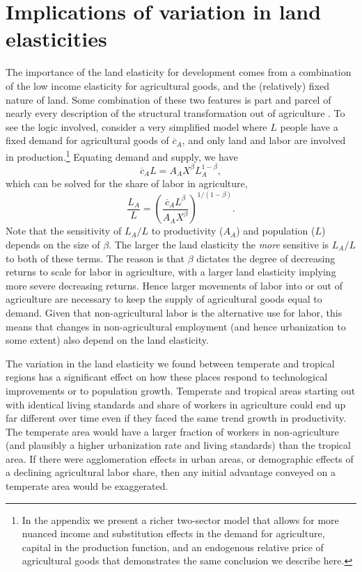 \documentclass[12pt]{article}
\begin{document}
\section{Implications of variation in land elasticities}\label{SEC_implications}
The importance of the land elasticity for development comes from a combination of the low income elasticity for agricultural goods, and the (relatively) fixed nature of land. Some combination of these two features is part and parcel of nearly every description of the structural transformation out of agriculture \citep{kp2001,Gollin:2007oq,Restuccia:2008hc,Gollin:2010ys,vollrath2011,Alvarez-Cuadrado:2011nx,hrv2014,duarte2010role}. To see the logic involved, consider a very simplified model where $L$ people have a fixed demand for agricultural goods of $\overline{c}_A$, and only land and labor are involved in production.\footnote{In the appendix we present a richer two-sector model that allows for more nuanced income and substitution effects in the demand for agriculture, capital in the production function, and an endogenous relative price of agricultural goods that demonstrates the same conclusion we describe here.} Equating demand and supply, we have
\begin{equation}
	\overline{c}_A L = A_A X^{\beta} L_A^{1-\beta},
\end{equation}
which can be solved for the share of labor in agriculture,
\begin{equation}
	\frac{L_A}{L} = \left(\frac{\overline{c}_A L^{\beta}}{A_A X^{\beta}}\right)^{1/(1-\beta)}.
\end{equation}
Note that the sensitivity of $L_A/L$ to productivity ($A_A$) and population ($L$) depends on the size of $\beta$. The larger the land elasticity the \textit{more} sensitive is $L_A/L$ to both of these terms. The reason is that $\beta$ dictates the degree of decreasing returns to scale for labor in agriculture, with a larger land elasticity implying more severe decreasing returns. Hence larger movements of labor into or out of agriculture are necessary to keep the supply of agricultural goods equal to demand. Given that non-agricultural labor is the alternative use for labor, this means that changes in non-agricultural employment (and hence urbanization to some extent) also depend on the land elasticity. 

The variation in the land elasticity we found between temperate and tropical regions has a significant effect on how these places respond to technological improvements or to population growth. Temperate and tropical areas starting out with identical living standards and share of workers in agriculture could end up far different over time even if they faced the same trend growth in productivity. The temperate area would have a larger fraction of workers in non-agriculture (and plausibly a higher urbanization rate and living standards) than the tropical area. If there were agglomeration effects in urban areas, or demographic effects of a declining agricultural labor share, then any initial advantage conveyed on a temperate area would be exaggerated.
\end{document}
